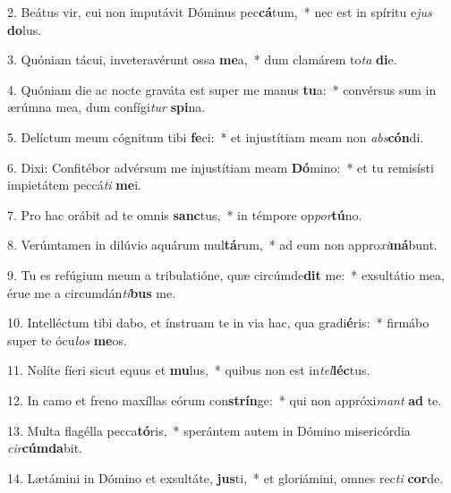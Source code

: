 2. Beátus vir, cui non imputávit Dóminus pec\textbf{cá}tum,~*  nec est in spíritu e\textit{jus} \textbf{do}lus.\

3. Quóniam tácui, inveteravérunt ossa \textbf{me}a,~*  dum clamárem to\textit{ta} \textbf{di}e.\

4. Quóniam die ac nocte graváta est super me manus \textbf{tu}a:~*  convérsus sum in ærúmna mea, dum confígi\textit{tur} \textbf{spi}na.\

5. Delíctum meum cógnitum tibi \textbf{fe}ci:~*  et injustítiam meam non \textit{abs}\textbf{cón}di.\

6. Dixi: Confitébor advérsum me injustítiam meam \textbf{Dó}mino:~*  et tu remisísti impietátem peccá\textit{ti} \textbf{me}i.\

7. Pro hac orábit ad te omnis \textbf{sanc}tus,~*  in témpore op\textit{por}\textbf{tú}no.\

8. Verúmtamen in dilúvio aquárum mul\textbf{tá}rum,~*  ad eum non appro\textit{xi}\textbf{má}bunt.\

9. Tu es refúgium meum a tribulatióne, quæ circúmde\textbf{dit} me:~*  exsultátio mea, érue me a circumdán\textit{ti}\textbf{bus} me.\

10. Intelléctum tibi dabo, et ínstruam te in via hac, qua gradi\textbf{é}ris:~*  firmábo super te ócu\textit{los} \textbf{me}os.\

11. Nolíte fíeri sicut equus et \textbf{mu}lus,~*  quibus non est in\textit{tel}\textbf{léc}tus.\

12. In camo et freno maxíllas eórum con\textbf{strín}ge:~*  qui non appróxi\textit{mant} \textbf{ad} te.\

13. Multa flagélla pecca\textbf{tó}ris,~*  sperántem autem in Dómino misericórdia \textit{cir}\textbf{cúm}\textbf{da}bit.\

14. Lætámini in Dómino et exsultáte, \textbf{jus}ti,~*  et gloriámini, omnes rec\textit{ti} \textbf{cor}de.\

